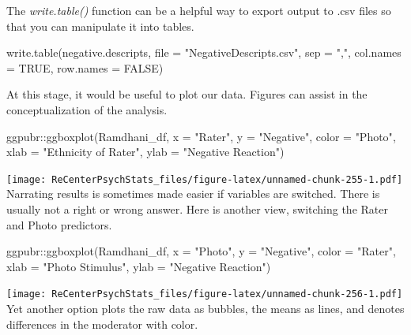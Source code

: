 \documentclass[
  11pt,
]{book}
\newenvironment{Shaded}{\begin{snugshade}}{\end{snugshade}}
\newcommand{\AttributeTok}[1]{\textcolor[rgb]{0.77,0.63,0.00}{#1}}
\newcommand{\ConstantTok}[1]{\textcolor[rgb]{0.00,0.00,0.00}{#1}}
\newcommand{\FunctionTok}[1]{\textcolor[rgb]{0.00,0.00,0.00}{#1}}
\newcommand{\NormalTok}[1]{#1}
\newcommand{\SpecialCharTok}[1]{\textcolor[rgb]{0.00,0.00,0.00}{#1}}
\newcommand{\StringTok}[1]{\textcolor[rgb]{0.31,0.60,0.02}{#1}}
\begin{document}
The \emph{write.table()} function can be a helpful way to export output to .csv files so that you can manipulate it into tables.

\begin{Shaded}
\begin{Highlighting}[]
\FunctionTok{write.table}\NormalTok{(negative.descripts, }\AttributeTok{file =} \StringTok{"NegativeDescripts.csv"}\NormalTok{, }\AttributeTok{sep =} \StringTok{","}\NormalTok{,}
    \AttributeTok{col.names =} \ConstantTok{TRUE}\NormalTok{, }\AttributeTok{row.names =} \ConstantTok{FALSE}\NormalTok{)}
\end{Highlighting}
\end{Shaded}

At this stage, it would be useful to plot our data. Figures can assist in the conceptualization of the analysis.

\begin{Shaded}
\begin{Highlighting}[]
\NormalTok{ggpubr}\SpecialCharTok{::}\FunctionTok{ggboxplot}\NormalTok{(Ramdhani\_df, }\AttributeTok{x =} \StringTok{"Rater"}\NormalTok{, }\AttributeTok{y =} \StringTok{"Negative"}\NormalTok{, }\AttributeTok{color =} \StringTok{"Photo"}\NormalTok{,}
    \AttributeTok{xlab =} \StringTok{"Ethnicity of Rater"}\NormalTok{, }\AttributeTok{ylab =} \StringTok{"Negative Reaction"}\NormalTok{)}
\end{Highlighting}
\end{Shaded}

\texttt{[image: ReCenterPsychStats\_files/figure-latex/unnamed-chunk-255-1.pdf]}
Narrating results is sometimes made easier if variables are switched. There is usually not a right or wrong answer. Here is another view, switching the Rater and Photo predictors.

\begin{Shaded}
\begin{Highlighting}[]
\NormalTok{ggpubr}\SpecialCharTok{::}\FunctionTok{ggboxplot}\NormalTok{(Ramdhani\_df, }\AttributeTok{x =} \StringTok{"Photo"}\NormalTok{, }\AttributeTok{y =} \StringTok{"Negative"}\NormalTok{, }\AttributeTok{color =} \StringTok{"Rater"}\NormalTok{,}
    \AttributeTok{xlab =} \StringTok{"Photo Stimulus"}\NormalTok{, }\AttributeTok{ylab =} \StringTok{"Negative Reaction"}\NormalTok{)}
\end{Highlighting}
\end{Shaded}

\texttt{[image: ReCenterPsychStats\_files/figure-latex/unnamed-chunk-256-1.pdf]}
Yet another option plots the raw data as bubbles, the means as lines, and denotes differences in the moderator with color.
\end{document}
